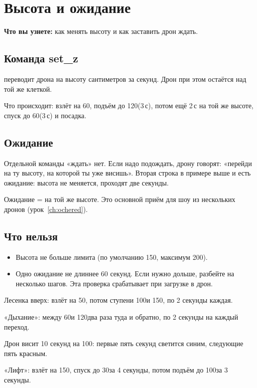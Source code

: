 \chapter{Высота и ожидание}\label{ch:vysota}

\textbf{Что вы узнете:} как менять высоту и как заставить дрон ждать.

\section{Команда set\_z}

 переводит дрона на высоту  сантиметров за  секунд. Дрон при этом остаётся над той же клеткой.


Что происходит: взлёт на 60\cm, подъём до 120\cm (3\,с), потом ещё 2\,с на той же высоте, спуск до 60\cm (3\,с) и посадка.

\section{Ожидание}

Отдельной команды «ждать» нет. Если надо подождать, дрону говорят: «перейди на ту высоту, на которой ты уже висишь». Вторая строка  в примере выше и есть ожидание: высота не меняется, проходят две секунды.

\begin{zametka}
Ожидание =  на той же высоте. Это основной приём для шоу из нескольких дронов (урок~\ref{ch:ochered}).
\end{zametka}

\section{Что нельзя}

\begin{itemize}
  \item Высота не больше лимита (по умолчанию 150\cm, максимум 200\cm).
  \item Одно ожидание не длиннее 60 секунд. Если нужно дольше, разбейте на несколько шагов. Эта проверка срабатывает при загрузке в дрон.
\end{itemize}

\begin{probuy}
  \item Лесенка вверх: взлёт на 50\cm, потом ступени 100\cm и 150\cm, по 2 секунды каждая.
  \item «Дыхание»: между 60\cm и 120\cm два раза туда и обратно, по 2 секунды на каждый переход.
  \item Дрон висит 10 секунд на 100\cm: первые пять секунд светится синим, следующие пять красным.
  \item «Лифт»: взлёт на 150\cm, спуск до 30\cm за 4 секунды, потом подъём до 100\cm за 3 секунды.
\end{probuy}
